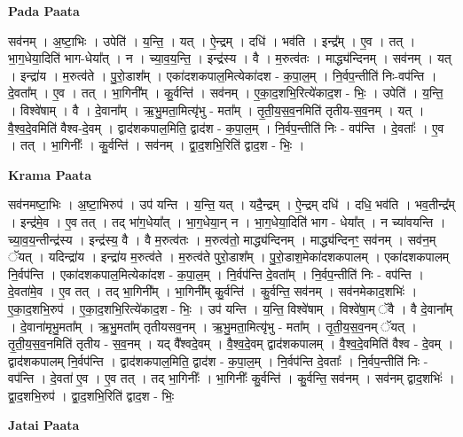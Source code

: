 \documentclass[17pt]{extarticle}
\begin{document}
\textbf{Pada Paata} \newline

सव॑नम् । अ॒ष्टा॒भिः । उपेति॑ । य॒न्ति॒ । यत् । ऐ॒न्द्रम् । दधि॑ । भव॑ति । इन्द्र᳚म् । ए॒व । तत् । भा॒ग॒धेया॒दिति॑ भाग-धेया᳚त् । न । च्या॒व॒य॒न्ति॒ । इन्द्र॑स्य । वै । म॒रुत्व॑तः । माद्ध्य॑न्दिनम् । सव॑नम् । यत् । इन्द्रा॑य । म॒रुत्व॑ते । पु॒रो॒डाश᳚म् । एका॑दशकपाल॒मित्येका॑दश - क॒पा॒ल॒म् । नि॒र्वप॒न्तीति॑ निः-वप॑न्ति । दे॒वता᳚म् । ए॒व । तत् । भा॒गिनी᳚म् । कु॒र्वन्ति॑ । सव॑नम् । ए॒का॒द॒शभि॒रित्ये॑काद॒श - भिः॒ । उपेति॑ । य॒न्ति॒ । विश्वे॑षाम् । वै । दे॒वाना᳚म् । ऋ॒भु॒मता॒मित्यृ॑भु - मता᳚म् । तृ॒ती॒य॒स॒व॒नमिति॑ तृतीय-स॒व॒नम् । यत् । वै॒श्व॒दे॒वमिति॑ वैश्व-दे॒वम् । द्वाद॑शकपाल॒मिति॒ द्वाद॑श - क॒पा॒ल॒म् । नि॒र्वप॒न्तीति॑ निः - वप॑न्ति । दे॒वताः᳚ । ए॒व । तत् । भा॒गिनीः᳚ । कु॒र्वन्ति॑ । सव॑नम् । द्वा॒द॒शभि॒रिति॑ द्वाद॒श - भिः॒ ।  \newline


\textbf{Krama Paata} \newline

सव॑नमष्टा॒भिः । अ॒ष्टा॒भिरुप॑ । उप॑ यन्ति । य॒न्ति॒ यत् । यदै॒न्द्रम् । ऐ॒न्द्रम् दधि॑ । दधि॒ भव॑ति । भव॒तीन्द्र᳚म् । इन्द्र॑मे॒व । ए॒व तत् । तद् भा॑ग॒धेया᳚त् । भा॒ग॒धेया॒न् न । भा॒ग॒धेया॒दिति॑ भाग - धेया᳚त् । न च्या॑वयन्ति । च्या॒व॒य॒न्तीन्द्र॑स्य । इन्द्र॑स्य॒ वै । वै म॒रुत्व॑तः । म॒रुत्व॑तो॒ माद्ध्य॑न्दिनम् । माद्ध्य॑न्दिनꣳ॒॒ सव॑नम् । सव॑न॒म् ॅयत् । यदिन्द्रा॑य । इन्द्रा॑य म॒रुत्व॑ते । म॒रुत्व॑ते पुरो॒डाश᳚म् । पु॒रो॒डाश॒मेका॑दशकपालम् । एका॑दशकपालम् नि॒र्वप॑न्ति । एका॑दशकपाल॒मित्येका॑दश - क॒पा॒ल॒म् । नि॒र्वप॑न्ति दे॒वता᳚म् । नि॒र्वप॒न्तीति॑ निः - वप॑न्ति । दे॒वता॑मे॒व । ए॒व तत् । तद् भा॒गिनी᳚म् । भा॒गिनी᳚म् कु॒र्वन्ति॑ । कु॒र्वन्ति॒ सव॑नम् । सव॑नमेकाद॒शभिः॑ । ए॒का॒द॒शभि॒रुप॑ । ए॒का॒द॒शभि॒रित्ये॑काद॒श - भिः॒ । उप॑ यन्ति । य॒न्ति॒ विश्वे॑षाम् । विश्वे॑षा॒म् ॅवै । वै दे॒वाना᳚म् । दे॒वाना॑मृभु॒मता᳚म् । ऋ॒भु॒मता᳚म् तृतीयसव॒नम् । ऋ॒भु॒मता॒मित्यृ॑भु - मता᳚म् । तृ॒ती॒य॒स॒व॒नम् ॅयत् । तृ॒ती॒य॒स॒व॒नमिति॑ तृतीय - स॒व॒नम् । यद् वै᳚श्वदे॒वम् । वै॒श्व॒दे॒वम् द्वाद॑शकपालम् । वै॒श्व॒दे॒वमिति॑ वैश्व - दे॒वम् । द्वाद॑शकपालम् नि॒र्वप॑न्ति । द्वाद॑शकपाल॒मिति॒ द्वाद॑श - क॒पा॒ल॒म् । नि॒र्वप॑न्ति दे॒वताः᳚ । नि॒र्वप॒न्तीति॑ निः - वप॑न्ति । दे॒वता॑ ए॒व । ए॒व तत् । तद् भा॒गिनीः᳚ । भा॒गिनीः᳚ कु॒र्वन्ति॑ । कु॒र्वन्ति॒ सव॑नम् । सव॑नम् द्वाद॒शभिः॑ । द्वा॒द॒शभि॒रुप॑ । द्वा॒द॒शभि॒रिति॑ द्वाद॒श - भिः॒ \newline

\textbf{Jatai Paata} \newline
\end{document}
